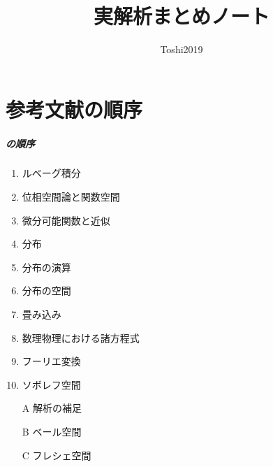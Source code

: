 


\def\inner<#1>{\langle #1 \rangle}

\def\ind<#1>{\mathop{\text{``}\hspace{-0.7pt}#1\limits\hspace{-1.5pt}\text{''}}}







\title{実解析まとめノート}
\author{Toshi2019}

\maketitle
\frontmatter
\tableofcontents
\layout
\mainmatter
\chapter{参考文献の順序}
\paragraph{\cite{B01}の順序}
\begin{enumerate}
    \item ルベーグ積分
    \item 位相空間論と関数空間
    \item 微分可能関数と近似
    \item 分布
    \item 分布の演算
    \item 分布の空間
    \item 畳み込み
    \item 数理物理における諸方程式
    \item フーリエ変換
    \item ソボレフ空間
    \item[A] 解析の補足
    \item[B] ベール空間
    \item[C] フレシェ空間
\end{enumerate}
